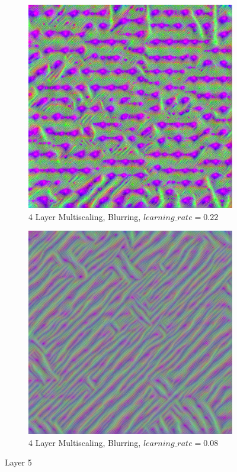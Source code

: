 \newpage
\begin{figure}
    \captionsetup{justification=centering}

    \begin{subfigure}[t]{0.48\textwidth}
        \captionsetup{justification=centering}
        \centering
        \includegraphics[width=.7\linewidth]{figuras/feat_vis/experiments/layers/initial/l5/random_image_pl4_lr2.2e-1_layer10.png}
        \caption{4 Layer Multiscaling, Blurring, \(learning\_rate = 0.22\)}
    \end{subfigure}
    \hfill
    \begin{subfigure}[t]{0.48\textwidth}
        \captionsetup{justification=centering}
        \centering
        \includegraphics[width=.7\linewidth]{figuras/feat_vis/experiments/layers/initial/l5/random_image_pl4_lr8e-2_layer10.png}
        \caption{4 Layer Multiscaling, Blurring, \(learning\_rate = 0.08\)}
    \end{subfigure}

    \caption{Layer 5}
    \label{fig:layer_5}
\end{figure}

